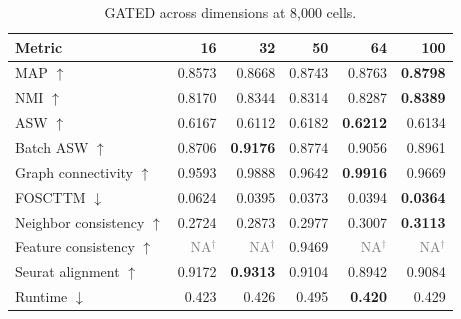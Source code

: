 \documentclass[10pt]{article}
\begin{document}
\begin{table}[H]\centering\scriptsize
\caption{GATED across dimensions at 8,000 cells.}
\begin{tabular}{@{}lrrrrr@{}}\toprule
Metric & 16 & 32 & 50 & 64 & 100 \\\midrule
MAP $\uparrow$ & 0.8573 & 0.8668 & 0.8743 & 0.8763 & \textbf{0.8798} \\
NMI $\uparrow$ & 0.8170 & 0.8344 & 0.8314 & 0.8287 & \textbf{0.8389} \\
ASW $\uparrow$ & 0.6167 & 0.6112 & 0.6182 & \textbf{0.6212} & 0.6134 \\
Batch ASW $\uparrow$ & 0.8706 & \textbf{0.9176} & 0.8774 & 0.9056 & 0.8961 \\
Graph connectivity $\uparrow$ & 0.9593 & 0.9888 & 0.9642 & \textbf{0.9916} & 0.9669 \\
FOSCTTM $\downarrow$ & 0.0624 & 0.0395 & 0.0373 & 0.0394 & \textbf{0.0364} \\
Neighbor consistency $\uparrow$ & 0.2724 & 0.2873 & 0.2977 & 0.3007 & \textbf{0.3113} \\
Feature consistency $\uparrow$ & \textcolor{gray}{NA$^{\dagger}$} & \textcolor{gray}{NA$^{\dagger}$} & 0.9469 & \textcolor{gray}{NA$^{\dagger}$} & \textcolor{gray}{NA$^{\dagger}$} \\
Seurat alignment $\uparrow$ & 0.9172 & \textbf{0.9313} & 0.9104 & 0.8942 & 0.9084 \\
Runtime $\downarrow$ & 0.423 & 0.426 & 0.495 & \textbf{0.420} & 0.429 \\
\bottomrule\end{tabular}\end{table}
\end{document}
